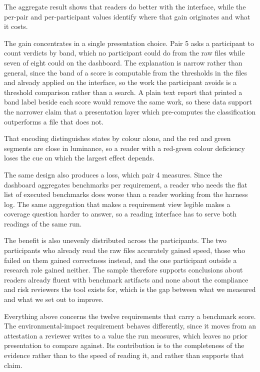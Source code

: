 \documentclass[10pt,conference]{IEEEtran}
\begin{document}
The aggregate result shows that readers do better with the interface, while the per-pair and per-participant values identify where that gain originates and what it costs.

The gain concentrates in a single presentation choice.
Pair 5 asks a participant to count verdicts by band, which no participant could do from the raw files while seven of eight could on the dashboard.
The explanation is narrow rather than general, since the band of a score is computable from the thresholds in the files and already applied on the interface, so the work the participant avoids is a threshold comparison rather than a search.
A plain text report that printed a band label beside each score would remove the same work, so these data support the narrower claim that a presentation layer which pre-computes the classification outperforms a file that does not.

That encoding distinguishes states by colour alone, and the red and green segments are close in luminance, so a reader with a red-green colour deficiency loses the cue on which the largest effect depends.

The same design also produces a loss, which pair 4 measures.
Since the dashboard aggregates benchmarks per requirement, a reader who needs the flat list of executed benchmarks does worse than a reader working from the harness log.
The same aggregation that makes a requirement view legible makes a coverage question harder to answer, so a reading interface has to serve both readings of the same run.

The benefit is also unevenly distributed across the participants.
The two participants who already read the raw files accurately gained speed, those who failed on them gained correctness instead, and the one participant outside a research role gained neither.
The sample therefore supports conclusions about readers already fluent with benchmark artifacts and none about the compliance and risk reviewers the tool exists for, which is the gap between what we measured and what we set out to improve.

Everything above concerns the twelve requirements that carry a benchmark score.
The environmental-impact requirement behaves differently, since it moves from an attestation a reviewer writes to a value the run measures, which leaves no prior presentation to compare against.
Its contribution is to the completeness of the evidence rather than to the speed of reading it, and  rather than  supports that claim.
\end{document}
